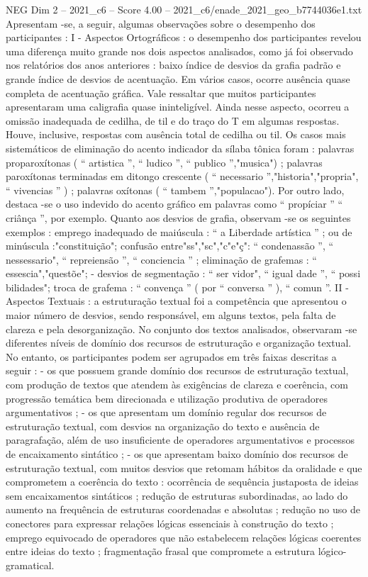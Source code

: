 \begin{textsample}{NEG Dim 2 – 2021\_c6 – Score 4.00 – 2021\_c6/enade\_2021\_geo\_b7744036e1.txt}
Apresentam -se, a seguir, algumas observações sobre o desempenho dos participantes : I - Aspectos Ortográficos : o desempenho dos participantes revelou uma diferença muito grande nos dois aspectos analisados, como já foi observado nos relatórios dos anos anteriores : baixo índice de desvios da grafia padrão e grande índice de desvios de acentuação.
Em vários casos, ocorre ausência quase completa de acentuação gráfica.
Vale ressaltar que muitos participantes apresentaram uma caligrafia quase ininteligível.
Ainda nesse aspecto, ocorreu a omissão inadequada de cedilha, de til e do traço do T em algumas respostas.
Houve, inclusive, respostas com ausência total de cedilha ou til.
Os casos mais sistemáticos de eliminação do acento indicador da sílaba tônica foram : palavras proparoxítonas ( “ artistica ”, “ ludico ”, “ publico ”,"musica") ; palavras paroxítonas terminadas em ditongo crescente ( “ necessario ”,"historia","propria", “ vivencias ” ) ; palavras oxítonas ( “ tambem ”,"populacao").
Por outro lado, destaca -se o uso indevido do acento gráfico em palavras como “ propíciar ” “ criânça ”, por exemplo.
Quanto aos desvios de grafia, observam -se os seguintes exemplos : emprego inadequado de maiúscula : “ a Liberdade artística ” ; ou de minúscula :"constituição"; confusão entre"ss","sc","c"e"ç": “ condenassão ”, “ nessessario", “ repreiensão ”, “ conciencia ” ; eliminação de grafemas : “ essescia","questõe"; - desvios de segmentação : “ ser vidor", “ igual dade ”, “ possi bilidades"; troca de grafema : “ convença ” ( por “ conversa ” ), “ comun ”.
II - Aspectos Textuais : a estruturação textual foi a competência que apresentou o maior número de desvios, sendo responsável, em alguns textos, pela falta de clareza e pela desorganização.
No conjunto dos textos analisados, observaram -se diferentes níveis de domínio dos recursos de estruturação e organização textual.
No entanto, os participantes podem ser agrupados em três faixas descritas a seguir : - os que possuem grande domínio dos recursos de estruturação textual, com produção de textos que atendem às exigências de clareza e coerência, com progressão temática bem direcionada e utilização produtiva de operadores argumentativos ; - os que apresentam um domínio regular dos recursos de estruturação textual, com desvios na organização do texto e ausência de paragrafação, além de uso insuficiente de operadores argumentativos e processos de encaixamento sintático ; - os que apresentam baixo domínio dos recursos de estruturação textual, com muitos desvios que retomam hábitos da oralidade e que comprometem a coerência do texto : ocorrência de sequência justaposta de ideias sem encaixamentos sintáticos ; redução de estruturas subordinadas, ao lado do aumento na frequência de estruturas coordenadas e absolutas ; redução no uso de conectores para expressar relações lógicas essenciais à construção do texto ; emprego equivocado de operadores que não estabelecem relações lógicas coerentes entre ideias do texto ; fragmentação frasal que compromete a estrutura lógico-gramatical.

\end{textsample}
